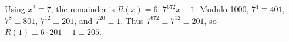 Using $x^3\equiv7$, the remainder is $R(x)=6\cdot7^{672}x-1$. Modulo 1000, $7^4\equiv401$, $7^8\equiv801$, $7^{12}\equiv201$, and $7^{20}\equiv1$. Thus $7^{672}\equiv7^{12}\equiv201$, so $R(1)\equiv6\cdot201-1\equiv\boxed{205}$.
